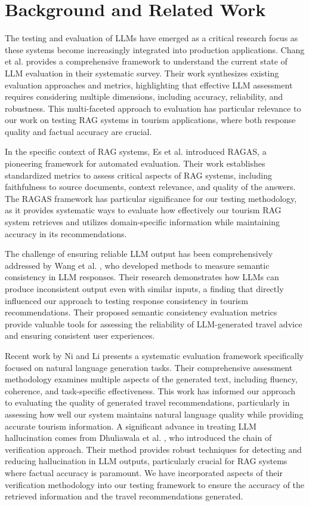 \section{Background and Related Work}
The testing and evaluation of LLMs have emerged as a critical research focus as these systems become increasingly integrated into production applications. Chang et al. \cite{ChangSurvey2024} provides a comprehensive framework to understand the current state of LLM evaluation in their systematic survey. Their work synthesizes existing evaluation approaches and metrics, highlighting that effective LLM assessment requires considering multiple dimensions, including accuracy, reliability, and robustness. This multi-faceted approach to evaluation has particular relevance to our work on testing RAG systems in tourism applications, where both response quality and factual accuracy are crucial.


In the specific context of RAG systems, Es et al. \cite{Shahul2024} introduced RAGAS, a pioneering framework for automated evaluation. Their work establishes standardized metrics to assess critical aspects of RAG systems, including faithfulness to source documents, context relevance, and quality of the answers. The RAGAS framework has particular significance for our testing methodology, as it provides systematic ways to evaluate how effectively our tourism RAG system retrieves and utilizes domain-specific information while maintaining accuracy in its recommendations.



The challenge of ensuring reliable LLM output has been comprehensively addressed by Wang et al. \cite{wang2023measuring}, who developed methods to measure semantic consistency in LLM responses. Their research demonstrates how LLMs can produce inconsistent output even with similar inputs, a finding that directly influenced our approach to testing response consistency in tourism recommendations. Their proposed semantic consistency evaluation metrics provide valuable tools for assessing the reliability of LLM-generated travel advice and ensuring consistent user experiences.


Recent work by Ni and Li \cite{Xuanfan2024} presents a systematic evaluation framework specifically focused on natural language generation tasks. Their comprehensive assessment methodology examines multiple aspects of the generated text, including fluency, coherence, and task-specific effectiveness. This work has informed our approach to evaluating the quality of generated travel recommendations, particularly in assessing how well our system maintains natural language quality while providing accurate tourism information. A significant advance in treating LLM hallucination comes from Dhuliawala et al. \cite{dhuliawala2024}, who introduced the chain of verification approach. Their method provides robust techniques for detecting and reducing hallucination in LLM outputs, particularly crucial for RAG systems where factual accuracy is paramount. We have incorporated aspects of their verification methodology into our testing framework to ensure the accuracy of the retrieved information and the travel recommendations generated.

